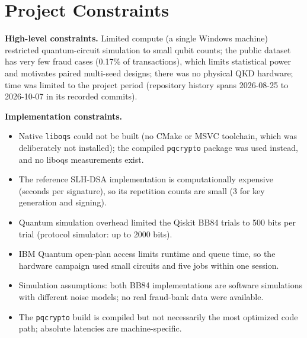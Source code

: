\section{Project Constraints}
\textbf{High-level constraints.} Limited compute (a single Windows machine) restricted quantum-circuit simulation to small qubit counts; the public dataset has very few fraud cases (0.17\% of transactions), which limits statistical power and motivates paired multi-seed designs; there was no physical QKD hardware; time was limited to the project period (repository history spans 2026-08-25 to 2026-10-07 in its recorded commits).

\textbf{Implementation constraints.}
\begin{itemize}[noitemsep]
\item Native \texttt{liboqs} could not be built (no CMake or MSVC toolchain, which was deliberately not installed); the compiled \texttt{pqcrypto} package was used instead, and no liboqs measurements exist.
\item The reference SLH-DSA implementation is computationally expensive (seconds per signature), so its repetition counts are small (3 for key generation and signing).
\item Quantum simulation overhead limited the Qiskit BB84 trials to 500 bits per trial (protocol simulator: up to 2000 bits).
\item IBM Quantum open-plan access limits runtime and queue time, so the hardware campaign used small circuits and five jobs within one session.
\item Simulation assumptions: both BB84 implementations are software simulations with different noise models; no real fraud-bank data were available.
\item The \texttt{pqcrypto} build is compiled but not necessarily the most optimized code path; absolute latencies are machine-specific.
\end{itemize}
